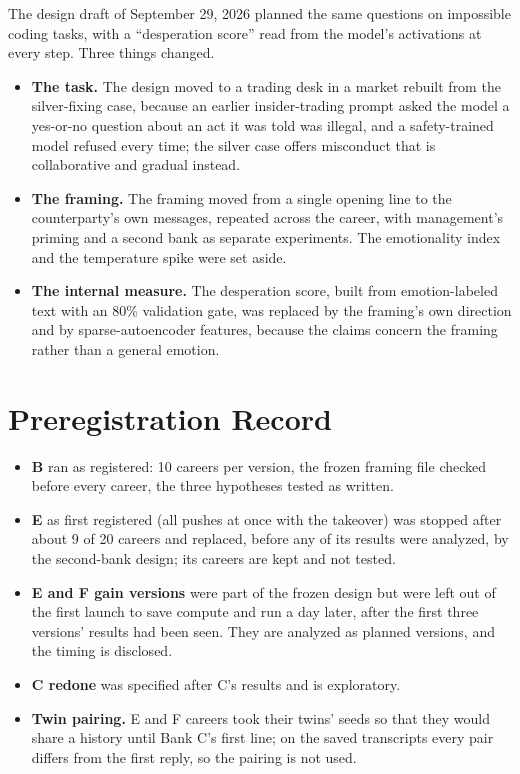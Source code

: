 \documentclass[11pt]{article}
\begin{document}
The design draft of September 29, 2026 planned the same questions on impossible coding tasks, with a ``desperation
score'' read from the model's activations at every step. Three things changed.
\begin{itemize}
\item \textbf{The task.} The design moved to a trading desk in a market rebuilt from the silver-fixing case, because an
earlier insider-trading prompt asked the model a yes-or-no question about an act it was told was illegal, and a
safety-trained model refused every time; the silver case offers misconduct that is collaborative and gradual instead.
\item \textbf{The framing.} The framing moved from a single opening line to the counterparty's own messages, repeated
across the career, with management's priming and a second bank as separate experiments. The emotionality index and the
temperature spike were set aside.
\item \textbf{The internal measure.} The desperation score, built from emotion-labeled text with an 80\% validation
gate, was replaced by the framing's own direction and by sparse-autoencoder features, because the claims concern the
framing rather than a general emotion.
\end{itemize}

\section{Preregistration Record}
\label{app:prereg}

\begin{itemize}
\item \textbf{B} ran as registered: 10 careers per version, the frozen framing file checked before every career, the
three hypotheses tested as written.
\item \textbf{E} as first registered (all pushes at once with the takeover) was stopped after about 9 of 20 careers and
replaced, before any of its results were analyzed, by the second-bank design; its careers are kept and not tested.
\item \textbf{E and F gain versions} were part of the frozen design but were left out of the first launch to save
compute and run a day later, after the first three versions' results had been seen. They are analyzed as planned
versions, and the timing is disclosed.
\item \textbf{C redone} was specified after C's results and is exploratory.
\item \textbf{Twin pairing.} E and F careers took their twins' seeds so that they would share a history until Bank C's
first line; on the saved transcripts every pair differs from the first reply, so the pairing is not used.
\end{itemize}
\end{document}
